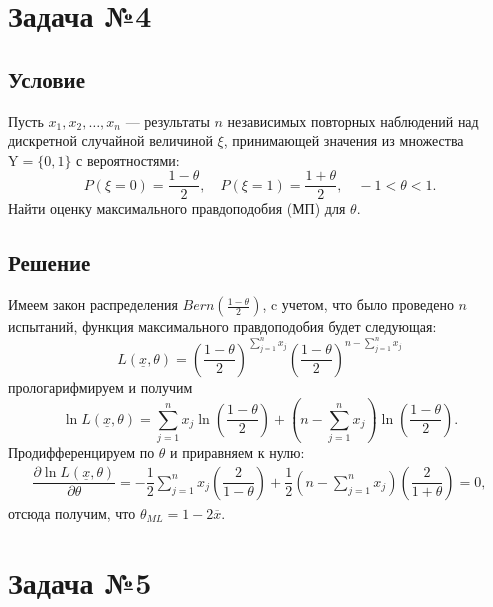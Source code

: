 \documentclass[12pt, a4paper]{article}
\begin{document}
				
			
	\newpage
	\section{Задача №4}
	
		\subsection*{Условие}
			Пусть $x_1, x_2, \dots, x_n$ --- результаты $n$ независимых повторных наблюдений над дискретной случайной величиной $\xi$, принимающей значения из множества $\mathrm{Y} = \{ 0, 1\}$ с вероятностями: 
			$$
				P\left(\xi = 0\right) = \dfrac{1 - \theta}{2}, 
				\quad
				P\left(\xi = 1\right) = \dfrac{1 + \theta}{2}, 
				\quad
				-1 < \theta < 1.
			$$
			Найти оценку максимального правдоподобия (МП) для $\theta$.
			
		\subsection*{Решение}
			Имеем закон распределения $Bern(\frac{1 - \theta}{2})$,			
			c учетом, что было проведено $n$ испытаний, функция максимального правдоподобия будет следующая: 
			$$
				L(\underline{x}, \theta) = \left(\dfrac{1 - \theta}{2}\right)^{\sum_{j = 1}^{n} x_j} 
				\left(\dfrac{1 - \theta}{2}\right)^{n - \sum_{j = 1}^{n} x_j}
			$$
			прологарифмируем и получим
			$$
				\ln L(\underline{x}, \theta) = \sum_{j = 1}^{n} x_j \ln{\left(\dfrac{1 - \theta}{2}\right)} + 
				(n - \sum_{j = 1}^{n} x_j) \ln{\left(\dfrac{1 - \theta}{2}\right)}.
			$$
			Продифференцируем по $\theta$ и приравняем к нулю:
			\begin{gather*}
				\dfrac{ \partial \ln L(\underline{x}, \theta) }{ \partial \theta} 
				= 
				- \dfrac{1}{2} \sum_{j = 1}^{n} x_j \left( \dfrac{2}{1 - \theta} \right) +
				\dfrac{1}{2} (n - \sum_{j = 1}^{n} x_j) \left( \dfrac{2}{1 + \theta} \right)	= 0, 
			\end{gather*}
			отсюда получим, что $\theta_{ML} = 1 - 2 \overline{x}$.
			
	\newpage
	\section{Задача №5}
	
\end{document}
